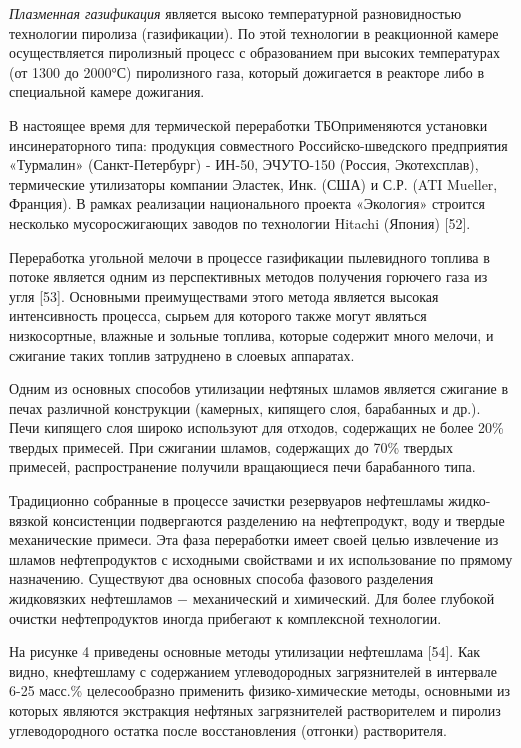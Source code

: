 \begin{multicols}{2}
\emph{Плазменная газификация} является высоко температурной
разновидностью технологии пиролиза (газификации). По этой технологии в
реакционной камере осуществляется пиролизный процесс с образованием при
высоких температурах (от 1300 до 2000°С) пиролизного газа, который
дожигается в реакторе либо в специальной камере дожигания.

В настоящее время для термической переработки ТБОприменяются установки
инсинераторного типа: продукция совместного Российско-шведского
предприятия «Турмалин» (Санкт-Петербург) - ИН-50, ЭЧУТО-150 (Россия,
Экотехсплав), термические утилизаторы компании Эластек, Инк. (США) и
С.Р. (ATI Mueller, Франция). В рамках реализации национального проекта
«Экология» строится несколько мусоросжигающих заводов по технологии
Hitachi (Япония) {[}52{]}.

Переработка угольной мелочи в процессе газификации пылевидного топлива в
потоке является одним из перспективных методов получения горючего газа
из угля {[}53{]}. Основными преимуществами этого метода является высокая
интенсивность процесса, сырьем для которого также могут являться
низкосортные, влажные и зольные топлива, которые содержит много мелочи,
и сжигание таких топлив затруднено в слоевых аппаратах.

Одним из основных способов утилизации нефтяных шламов является сжигание
в печах различной конструкции (камерных, кипящего слоя, барабанных и
др.). Печи кипящего слоя широко используют для отходов, содержащих не
более 20\% твердых примесей. При сжигании шламов, содержащих до 70\%
твердых примесей, распространение получили вращающиеся печи барабанного
типа.

Традиционно собранные в процессе зачистки резервуаров нефтешламы
жидко-вязкой консистенции подвергаются разделению на нефтепродукт, воду
и твердые механические примеси. Эта фаза переработки имеет своей целью
извлечение из шламов нефтепродуктов с исходными свойствами и их
использование по прямому назначению. Существуют два основных способа
фазового разделения жидковязких нефтешламов − механический и химический.
Для более глубокой очистки нефтепродуктов иногда прибегают к комплексной
технологии.

На рисунке 4 приведены основные методы утилизации нефтешлама {[}54{]}.
Как видно, кнефтешламу с содержанием углеводородных загрязнителей в
интервале 6-25 масс.\% целесообразно применить физико-химические методы,
основными из которых являются экстракция нефтяных загрязнителей
растворителем и пиролиз углеводородного остатка после восстановления
(отгонки) растворителя.
\end{multicols}

